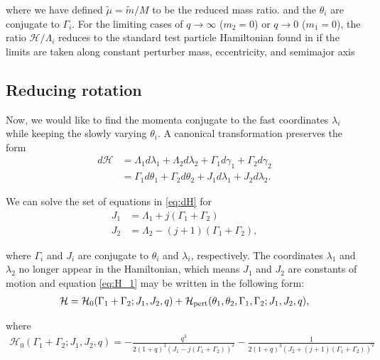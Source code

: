 \documentclass[usenatbib,twocolumn]{mnras}
\begin{document}
\noindent where we have defined \(\tilde\mu=\tilde m/M\) to be
the reduced mass ratio.  and the \(\theta_i\) are conjugate to
\(\Gamma_i\).  For the limiting cases of \(q\to \infty\) (\(m_2=0\)) or
\(q\to 0\) (\(m_1=0\)), the ratio \(\mathcal{H}/\Lambda_i\) reduces to the
standard test particle Hamiltonian found in \citet{murray_solar_2000} if
the limits are taken along constant perturber mass, eccentricity, and semimajor axis
\citep[e.g.][]{moutamid14_coupl_between_corot_lindb_reson}
\subsection{Reducing rotation}
\label{sec:org6502968}
Now, we would like to find the momenta conjugate to the fast
coordinates \(\lambda_i\) while keeping the slowly varying \(\theta_i\).
A canonical transformation preserves the form
\begin{align}
  \label{eq:dH} 
  d\mathcal{H}
  &= \Lambda_1 d\lambda_1+\Lambda_2d\lambda_2
    + \Gamma_1d\gamma_1+\Gamma_2d\gamma_2\nonumber\\
  &= \Gamma_1 d\theta_1 + \Gamma_2 d\theta_2
    +J_1 d\lambda_1+J_2d\lambda_2 .
\end{align}

\noindent
We can solve the set of equations in \eqref{eq:dH} for
\begin{align}
\label{eq:J1}
J_1 &= \Lambda_1 + j(\Gamma_1+\Gamma_2)\\
\label{eq:J2}
J_2 &= \Lambda_2 - (j+1)(\Gamma_1+\Gamma_2),
\end{align}

\noindent where \(\Gamma_i\) and \(J_i\) are conjugate to
\(\theta_i\) and \(\lambda_i\), respectively.
The coordinates \(\lambda_1\) and \(\lambda_2\)
no longer appear in the Hamiltonian,
which means \(J_1\) and \(J_2\) are constants of motion and
equation \eqref{eq:H_1} may be written
in the following form:
\begin{align}
\label{eq:H_2}
  \mathcal{H}
  = \mathcal{H}_0(\Gamma_1+\Gamma_2; J_1, J_2, q)
                  + \mathcal{H}_{\rm pert}(\theta_1, \theta_2, \Gamma_1,\Gamma_2; J_1, J_2, q),
\end{align}

\noindent
where
\begin{align}
  \label{eq:H01}
  \mathcal{H}_0(\Gamma_1+\Gamma_2; J_1, J_2, q)
  = -\frac{q^3}{2(1+q)^3(J_1-j(\Gamma_1+\Gamma_2))^2}
  -\frac{1}{2(1+q)^3(J_2+(j+1)(\Gamma_1+\Gamma_2))^2} 
\end{align}
\end{document}
